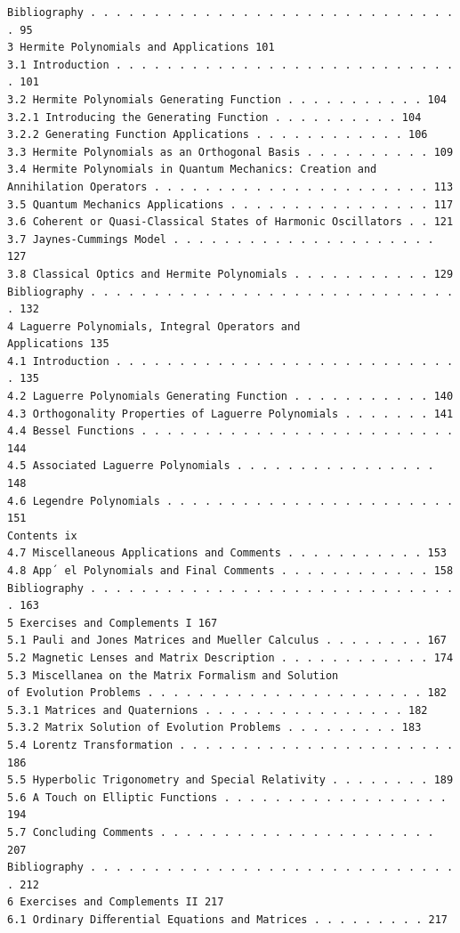 \begin{verbatim}
Bibliography . . . . . . . . . . . . . . . . . . . . . . . . . . . . . . 95
3 Hermite Polynomials and Applications 101
3.1 Introduction . . . . . . . . . . . . . . . . . . . . . . . . . . . . 101
3.2 Hermite Polynomials Generating Function . . . . . . . . . . . 104
3.2.1 Introducing the Generating Function . . . . . . . . . . 104
3.2.2 Generating Function Applications . . . . . . . . . . . . 106
3.3 Hermite Polynomials as an Orthogonal Basis . . . . . . . . . . 109
3.4 Hermite Polynomials in Quantum Mechanics: Creation and
Annihilation Operators . . . . . . . . . . . . . . . . . . . . . . 113
3.5 Quantum Mechanics Applications . . . . . . . . . . . . . . . . 117
3.6 Coherent or Quasi-Classical States of Harmonic Oscillators . . 121
3.7 Jaynes-Cummings Model . . . . . . . . . . . . . . . . . . . . . 127
3.8 Classical Optics and Hermite Polynomials . . . . . . . . . . . 129
Bibliography . . . . . . . . . . . . . . . . . . . . . . . . . . . . . . 132
4 Laguerre Polynomials, Integral Operators and
Applications 135
4.1 Introduction . . . . . . . . . . . . . . . . . . . . . . . . . . . . 135
4.2 Laguerre Polynomials Generating Function . . . . . . . . . . . 140
4.3 Orthogonality Properties of Laguerre Polynomials . . . . . . . 141
4.4 Bessel Functions . . . . . . . . . . . . . . . . . . . . . . . . . 144
4.5 Associated Laguerre Polynomials . . . . . . . . . . . . . . . . 148
4.6 Legendre Polynomials . . . . . . . . . . . . . . . . . . . . . . . 151
Contents ix
4.7 Miscellaneous Applications and Comments . . . . . . . . . . . 153
4.8 App´ el Polynomials and Final Comments . . . . . . . . . . . . 158
Bibliography . . . . . . . . . . . . . . . . . . . . . . . . . . . . . . 163
5 Exercises and Complements I 167
5.1 Pauli and Jones Matrices and Mueller Calculus . . . . . . . . 167
5.2 Magnetic Lenses and Matrix Description . . . . . . . . . . . . 174
5.3 Miscellanea on the Matrix Formalism and Solution
of Evolution Problems . . . . . . . . . . . . . . . . . . . . . . 182
5.3.1 Matrices and Quaternions . . . . . . . . . . . . . . . . 182
5.3.2 Matrix Solution of Evolution Problems . . . . . . . . . 183
5.4 Lorentz Transformation . . . . . . . . . . . . . . . . . . . . . . 186
5.5 Hyperbolic Trigonometry and Special Relativity . . . . . . . . 189
5.6 A Touch on Elliptic Functions . . . . . . . . . . . . . . . . . . 194
5.7 Concluding Comments . . . . . . . . . . . . . . . . . . . . . . 207
Bibliography . . . . . . . . . . . . . . . . . . . . . . . . . . . . . . 212
6 Exercises and Complements II 217
6.1 Ordinary Diﬀerential Equations and Matrices . . . . . . . . . 217

\end{verbatim}
